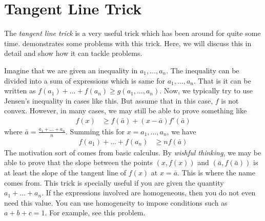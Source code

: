 \documentclass[inequalities.tex]{subfile}
\begin{document}
	
	\chapter{Tangent Line Trick}\label{ch:tangent}
	The \textit{tangent line trick} is a very useful trick which has been around for quite some time. \textcite{li_2006} demonstrates some problems with this trick. Here, we will discuss this in detail and show how it can tackle problems.
	
	Imagine that we are given an inequality in $a_{1},\ldots,a_{n}$. The inequality can be divided into a sum of expressions which is same for $a_{1},\ldots,a_{n}$. That is it can be written as $f(a_{1})+\ldots+f(a_{n})\geq g(a_{1},\ldots,a_{n})$. Now, we typically try to use Jensen's inequality in cases like this. But assume that in this case,  $f$ is not convex. However, in many cases, we may still be able to prove something like
		\begin{align*}
			f(x)
				& \geq f(\bar{a})+(x-\bar{a})f'(\bar{a})
		\end{align*}
	where $\bar{a}=\frac{a_{1}+\ldots+a_{n}}{n}$. Summing this for $x=a_{1},\ldots,a_{n}$, we have
		\begin{align*}
			f(a_{1})+\ldots+f(a_{n})
				& \geq nf(\bar{a})
		\end{align*}
	The motivation sort of comes from basic calculus. By \textit{wishful thinking}, we may be able to prove that the slope between the points $(x,f(x))$ and $(\bar{a},f(\bar{a}))$ is at least the slope of the tangent line of $f(x)$ at $x=\bar{a}$. This is where the name comes from. This trick is specially useful if you are given the quantity $a_{1}+\ldots+a_{n}$. If the expressions involved are homogeneous, then you do not even need this value. You can use homogeneity to impose conditions such as $a+b+c=1$. For example, see this problem.
\end{document}
